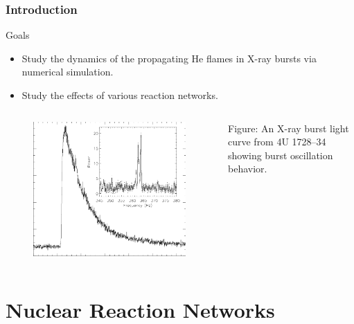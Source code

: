 \documentclass[
	11pt, %
]{beamer}
\begin{document}
\begin{frame}
    \frametitle{Introduction}
        \begin{block}{Goals}
            \begin{itemize}
                \item Study the dynamics of the propagating He flames in X-ray bursts via numerical simulation.
                \item Study the effects of various reaction networks.
            \end{itemize}
        \end{block}

        \begin{columns}
            \begin{figure}
                \centering
                \includegraphics[width=0.68\linewidth]{x-ray-burst-lightcurve.png}
            \end{figure}

            {\color{blue}Figure:} An X-ray burst light curve from 4U 1728–34 showing burst oscillation behavior. \cite{strohmayer_2009}
        \end{columns}



  
\end{frame}

\section{Nuclear Reaction Networks}

\end{document}
